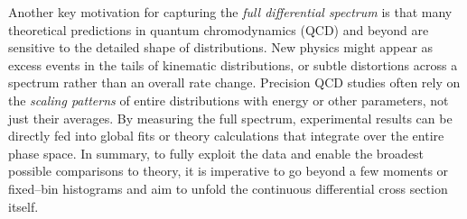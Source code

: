     Another key motivation for capturing the \emph{full differential spectrum} is that many theoretical predictions in quantum chromodynamics (QCD) and beyond are sensitive to the detailed shape of distributions.
    New physics might appear as excess events in the tails of kinematic distributions, or subtle distortions across a spectrum rather than an overall rate change.
    Precision QCD studies often rely on the \emph{scaling patterns} of entire distributions with energy or other parameters, not just their averages.
    By measuring the full spectrum, experimental results can be directly fed into global fits or theory calculations that integrate over the entire phase space.
    In summary, to fully exploit the data and enable the broadest possible comparisons to theory, it is imperative to go beyond a few moments or fixed--bin histograms and aim to unfold the continuous differential cross section itself.


